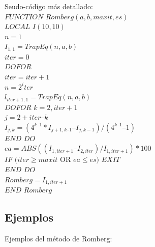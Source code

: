 \documentclass[journal,transmag]{IEEEtran}
\theoremstyle{mytheoremstyle}
\theoremstyle{mytheoremstyle}
\theoremstyle{myproblemstyle}
\begin{document}
        Seudo-código más detallado: \cite{chapra_mtodos_2007} \\
        $FUNCTION$ $Romberg (a, b, maxit, es)$ \\
        $LOCAL$ $I(10, 10)$ \\
        $n = 1$ \\
        $I_{1,1} = TrapEq(n, a, b)$ \\
        $iter = 0$ \\
        $DOFOR$ \\
        $iter = iter + 1$ \\
        $n = 2^iter$ \\
        $l_{iter+1,1} = TrapEq(n, a, b)$ \\   
        $DOFOR$ $k = 2, iter + 1$ \\
        $j = 2 + iter – k$ \\
        $I_{j,k} = (4^{k–1} * I_{j+1,k–1} – I_{j,k-1})/(4^{k–1} – 1)$ \\
        $END$ $DO$ \\
        $ea = ABS((I_{1,iter+1} – I_{2,iter})/I_{1,iter+1}) * 100$ \\
        $IF$ $(iter \geq maxit $ OR $ ea \leq es)$ $EXIT$ \\
        $END$ $DO$ \\
        $Romberg = I_{1,iter+1}$ \\
        $END$ $Romberg$ 

\subsection{Ejemplos}
    Ejemplos del método de Romberg: \cite{in_mr}
\end{document}
